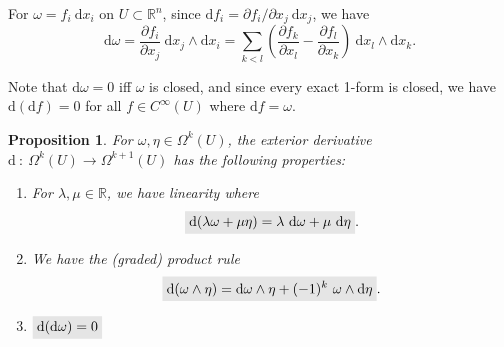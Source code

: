 \documentclass[letter-paper]{tufte-book}
\newtheorem{proposition}[theorem]{\color{pastel-blue}Proposition}
\newenvironment{example}[1][Example]{\begin{trivlist}
\item[\hskip \labelsep {\bfseries #1}]}{\end{trivlist}}
\newcommand{\highlight}[1]{\mathchoice%
  {\colorbox{black!10}{$\displaystyle#1$}}%
  {\colorbox{black!10}{$\textstyle#1$}}%
  {\colorbox{black!10}{$\scriptstyle#1$}}%
  {\colorbox{black!10}{$\scriptscriptstyle#1$}}}%
\begin{document}
\begin{example}
  For $\omega = f_i\ \mathrm{d}x_i$ on $U\subset \mathbb{R}^n$, since $\mathrm{d}f_i = \partial f_i / \partial x_j\ \mathrm{d}x_j$, we have
  \begin{equation}
    \mathrm{d}\omega = \frac{\partial f_i}{\partial x_j}\ \mathrm{d}x_j \wedge \mathrm{d}x_i = \sum_{k<l} \left(\frac{\partial f_k}{\partial x_l} - \frac{\partial f_l}{\partial x_k} \right)\ \mathrm{d}x_l \wedge \mathrm{d}x_k.
  \end{equation}
\end{example}

Note that $\mathrm{d}\omega = 0$ iff $\omega$ is closed, and since every exact 1-form is closed, we have $\mathrm{d}(\mathrm{d}f) = 0$ for all $f \in C^\infty(U)$ where $\mathrm{d}f = \omega$.

\begin{proposition}
  For $\omega, \eta \in \Omega^k(U)$, the exterior derivative $\mathrm{d}\ :\ \Omega^k(U) \to \Omega^{k+1}(U)$ has the following properties:
  \begin{enumerate}
    \item For $\lambda, \mu \in \mathbb{R}$, we have linearity where
    \begin{equation}
      \highlight{\mathrm{d}(\lambda \omega + \mu \eta) = \lambda\ \mathrm{d}\omega + \mu\ \mathrm{d}\eta}.
    \end{equation}
    
    \item We have the (graded) product rule
    \begin{equation}
      \highlight{\mathrm{d}(\omega \wedge \eta) = \mathrm{d}\omega \wedge \eta + (-1)^k\ \omega \wedge \mathrm{d}\eta}.
    \end{equation}
    
    \item $\highlight{\mathrm{d}(\mathrm{d}\omega) = 0}$
  \end{enumerate}
\end{proposition}
\end{document}
